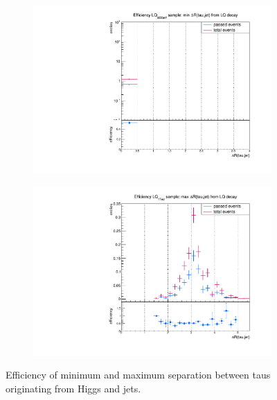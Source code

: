 \begin{figure}
\begin{subfigure}[t]{0.49\textwidth}
                \label{dRFromLQ:signal:taujet:maxLQ75}
                \end{subfigure}
                \begin{subfigure}[t]{0.49\textwidth}
                \includegraphics[width=\textwidth]{figures/plots/LQ76/Divided_fromLQ_mindR_taujet.pdf}
                \label{dRFromLQ:signal:taujet:minLQ76}
                \end{subfigure}
                \begin{subfigure}[t]{0.49\textwidth}
                \includegraphics[width=\textwidth]{figures/plots/LQ76/Divided_maxdR_fromLQ_taujet.pdf}
                \label{dRFromLQ:signal:taujet:maxLQ76}
                \end{subfigure}
\caption[Efficiency of separation between taus originating from Higgs and jets.]{Efficiency of minimum and maximum separation between taus originating from Higgs and jets.}
\label{dRFromLQ:signal:taujet}
\end{figure}
